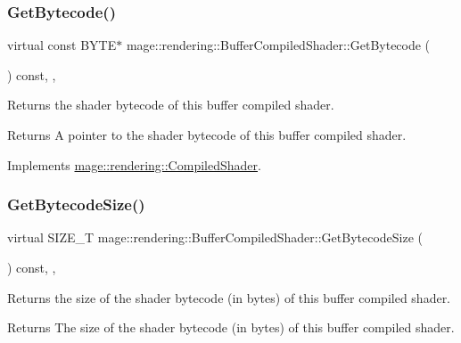 \subsubsection{\texorpdfstring{Get\+Bytecode()}{GetBytecode()}}
{\footnotesize\ttfamily virtual const B\+Y\+TE$\ast$ mage\+::rendering\+::\+Buffer\+Compiled\+Shader\+::\+Get\+Bytecode (\begin{DoxyParamCaption}{ }\end{DoxyParamCaption}) const\hspace{0.3cm}{\ttfamily [override]}, {\ttfamily [virtual]}, {\ttfamily [noexcept]}}

Returns the shader bytecode of this buffer compiled shader.

\begin{DoxyReturn}{Returns}
A pointer to the shader bytecode of this buffer compiled shader. 
\end{DoxyReturn}


Implements \mbox{\hyperlink{classmage_1_1rendering_1_1_compiled_shader_a6067250341f428be19ed2aa9955a10b6}{mage\+::rendering\+::\+Compiled\+Shader}}.

\mbox{\label{classmage_1_1rendering_1_1_buffer_compiled_shader_a235948a6ba0bcac698d6e35ce3504da2}} 
\subsubsection{\texorpdfstring{Get\+Bytecode\+Size()}{GetBytecodeSize()}}
{\footnotesize\ttfamily virtual S\+I\+Z\+E\+\_\+T mage\+::rendering\+::\+Buffer\+Compiled\+Shader\+::\+Get\+Bytecode\+Size (\begin{DoxyParamCaption}{ }\end{DoxyParamCaption}) const\hspace{0.3cm}{\ttfamily [override]}, {\ttfamily [virtual]}, {\ttfamily [noexcept]}}

Returns the size of the shader bytecode (in bytes) of this buffer compiled shader.

\begin{DoxyReturn}{Returns}
The size of the shader bytecode (in bytes) of this buffer compiled shader. 
\end{DoxyReturn}


